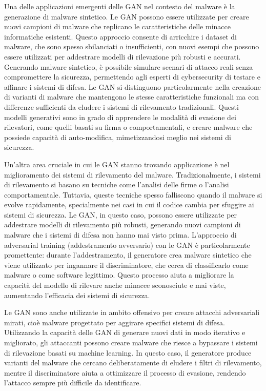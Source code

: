 Una delle applicazioni emergenti delle GAN nel contesto del malware è la generazione di malware sintetico. Le GAN possono essere utilizzate per creare nuovi campioni di malware che replicano le caratteristiche delle minacce informatiche esistenti. Questo approccio consente di arricchire i dataset di malware, che sono spesso sbilanciati o insufficienti, con nuovi esempi che possono essere utilizzati per addestrare modelli di rilevazione più robusti e accurati. Generando malware sintetico, è possibile simulare scenari di attacco reali senza compromettere la sicurezza, permettendo agli esperti di cybersecurity di testare e affinare i sistemi di difesa.
Le GAN si distinguono particolarmente nella creazione di varianti di malware che mantengono le stesse caratteristiche funzionali ma con differenze sufficienti da eludere i sistemi di rilevamento tradizionali. Questi modelli generativi sono in grado di apprendere le modalità di evasione dei rilevatori, come quelli basati su firma o comportamentali, e creare malware che possiede capacità di auto-modifica, mimetizzandosi meglio nei sistemi di sicurezza.

Un'altra area cruciale in cui le GAN stanno trovando applicazione è nel miglioramento dei sistemi di rilevamento del malware. Tradizionalmente, i sistemi di rilevamento si basano su tecniche come l'analisi delle firme o l'analisi comportamentale. Tuttavia, queste tecniche spesso falliscono quando il malware si evolve rapidamente, specialmente nei casi in cui il codice cambia per sfuggire ai sistemi di sicurezza. Le GAN, in questo caso, possono essere utilizzate per addestrare modelli di rilevamento più robusti, generando nuovi campioni di malware che i sistemi di difesa non hanno mai visto prima.
L'approccio di adversarial training (addestramento avversario) con le GAN è particolarmente promettente: durante l'addestramento, il generatore crea malware sintetico che viene utilizzato per ingannare il discriminatore, che cerca di classificarlo come malware o come software legittimo. Questo processo aiuta a migliorare la capacità del modello di rilevare anche minacce sconosciute e mai viste, aumentando l'efficacia dei sistemi di sicurezza.

Le GAN sono anche utilizzate in ambito offensivo per creare attacchi adversariali mirati, cioè malware progettato per aggirare specifici sistemi di difesa. Utilizzando la capacità delle GAN di generare nuovi dati in modo iterativo e migliorato, gli attaccanti possono creare malware che riesce a bypassare i sistemi di rilevazione basati su machine learning. In questo caso, il generatore produce varianti del malware che cercano deliberatamente di eludere i filtri di rilevamento, mentre il discriminatore aiuta a ottimizzare il processo di evasione, rendendo l'attacco sempre più difficile da identificare.


